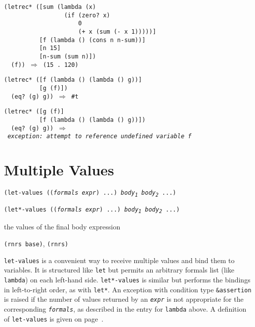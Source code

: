 \begin{alltt}
(letrec* ([sum (lambda (x)
                 (if (zero? x)
                     0
                     (+ x (sum (- x 1)))))]
          [f (lambda () (cons n n-sum))]
          [n 15]
          [n-sum (sum n)])
  (f)) \(\Rightarrow\) (15 . 120)

(letrec* ([f (lambda () (lambda () g))]
          [g (f)])
  (eq? (g) g)) \(\Rightarrow\) \#{}t

(letrec* ([g (f)]
          [f (lambda () (lambda () g))])
  (eq? (g) g)) \(\Rightarrow\) \textit{exception: attempt to reference undefined variable f}
\end{alltt}

\section{\label{binding_g93}\label{binding_h5}Multiple Values\label{binding_SECTLETVALUES}}


\begin{description}

\label{binding_s23}\label{binding_desc_let_values}
\item[syntax] \texttt{(let-values ((\textit{formals} \textit{expr}) ...) \textit{body\textsubscript{1}} \textit{body\textsubscript{2}} ...)}



\item[syntax] \texttt{(let*-values ((\textit{formals} \textit{expr}) ...) \textit{body\textsubscript{1}} \textit{body\textsubscript{2}} ...)}



\item[returns] the values of the final body expression


\item[libraries] \texttt{(rnrs base)}, \texttt{(rnrs)}
\end{description}

\texttt{let-values} is a convenient way to receive multiple
values and bind them to variables.
It is structured like \texttt{let} but permits an arbitrary
formals list (like \texttt{lambda}) on each left-hand
side.
\texttt{let*-values} is similar but performs the bindings in
left-to-right order, as with \texttt{let*}.
An exception with condition type \texttt{\&{}assertion} is raised
if the number of values returned by an \texttt{\textit{expr}} is not appropriate
for the corresponding \texttt{\textit{formals}}, as described in the entry
for \texttt{lambda} above.
A definition of \texttt{let-values} is given on page \pageref{syntax_fullletvalues}.


